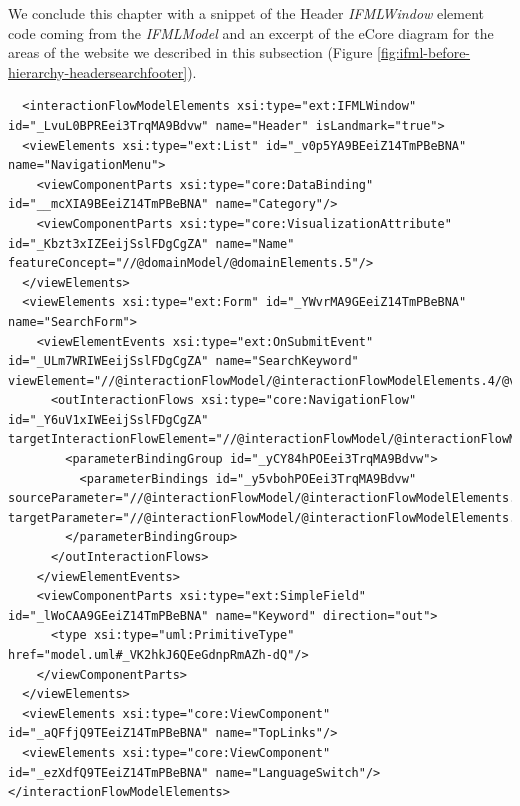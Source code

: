 We conclude this chapter with a snippet of the Header \textit{IFMLWindow} element code coming from the \textit{IFMLModel} and an excerpt of the eCore diagram for the areas of the website we described in this subsection (Figure \ref{fig:ifml-before-hierarchy-headersearchfooter}).

\lstset{language=XML}
\begin{lstlisting} 
  <interactionFlowModelElements xsi:type="ext:IFMLWindow" id="_LvuL0BPREei3TrqMA9Bdvw" name="Header" isLandmark="true">
  <viewElements xsi:type="ext:List" id="_v0p5YA9BEeiZ14TmPBeBNA" name="NavigationMenu">
    <viewComponentParts xsi:type="core:DataBinding" id="__mcXIA9BEeiZ14TmPBeBNA" name="Category"/>
    <viewComponentParts xsi:type="core:VisualizationAttribute" id="_Kbzt3xIZEeijSslFDgCgZA" name="Name" featureConcept="//@domainModel/@domainElements.5"/>
  </viewElements>
  <viewElements xsi:type="ext:Form" id="_YWvrMA9GEeiZ14TmPBeBNA" name="SearchForm">
    <viewElementEvents xsi:type="ext:OnSubmitEvent" id="_ULm7WRIWEeijSslFDgCgZA" name="SearchKeyword" viewElement="//@interactionFlowModel/@interactionFlowModelElements.4/@viewElements.1">
      <outInteractionFlows xsi:type="core:NavigationFlow" id="_Y6uV1xIWEeijSslFDgCgZA" targetInteractionFlowElement="//@interactionFlowModel/@interactionFlowModelElements.3">
        <parameterBindingGroup id="_yCY84hPOEei3TrqMA9Bdvw">
          <parameterBindings id="_y5vbohPOEei3TrqMA9Bdvw" sourceParameter="//@interactionFlowModel/@interactionFlowModelElements.4/@viewElements.1/@viewComponentParts.0" targetParameter="//@interactionFlowModel/@interactionFlowModelElements.3/@parameters.0"/>
        </parameterBindingGroup>
      </outInteractionFlows>
    </viewElementEvents>
    <viewComponentParts xsi:type="ext:SimpleField" id="_lWoCAA9GEeiZ14TmPBeBNA" name="Keyword" direction="out">
      <type xsi:type="uml:PrimitiveType" href="model.uml#_VK2hkJ6QEeGdnpRmAZh-dQ"/>
    </viewComponentParts>
  </viewElements>
  <viewElements xsi:type="core:ViewComponent" id="_aQFfjQ9TEeiZ14TmPBeBNA" name="TopLinks"/>
  <viewElements xsi:type="core:ViewComponent" id="_ezXdfQ9TEeiZ14TmPBeBNA" name="LanguageSwitch"/>
</interactionFlowModelElements>
\end{lstlisting}



